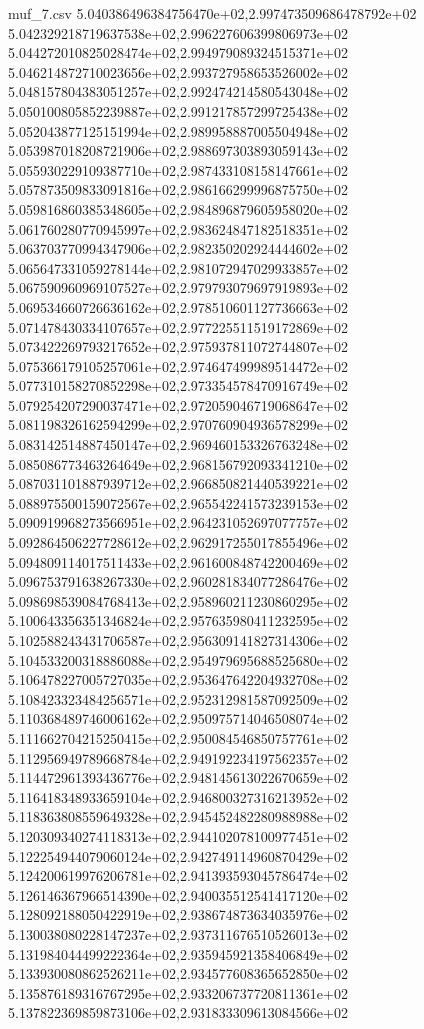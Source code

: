 \begin{filecontents*}{muf_7.csv}
5.040386496384756470e+02,2.997473509686478792e+02
5.042329218719637538e+02,2.996227606399806973e+02
5.044272010825028474e+02,2.994979089324515371e+02
5.046214872710023656e+02,2.993727958653526002e+02
5.048157804383051257e+02,2.992474214580543048e+02
5.050100805852239887e+02,2.991217857299725438e+02
5.052043877125151994e+02,2.989958887005504948e+02
5.053987018208721906e+02,2.988697303893059143e+02
5.055930229109387710e+02,2.987433108158147661e+02
5.057873509833091816e+02,2.986166299996875750e+02
5.059816860385348605e+02,2.984896879605958020e+02
5.061760280770945997e+02,2.983624847182518351e+02
5.063703770994347906e+02,2.982350202924444602e+02
5.065647331059278144e+02,2.981072947029933857e+02
5.067590960969107527e+02,2.979793079697919893e+02
5.069534660726636162e+02,2.978510601127736663e+02
5.071478430334107657e+02,2.977225511519172869e+02
5.073422269793217652e+02,2.975937811072744807e+02
5.075366179105257061e+02,2.974647499989514472e+02
5.077310158270852298e+02,2.973354578470916749e+02
5.079254207290037471e+02,2.972059046719068647e+02
5.081198326162594299e+02,2.970760904936578299e+02
5.083142514887450147e+02,2.969460153326763248e+02
5.085086773463264649e+02,2.968156792093341210e+02
5.087031101887939712e+02,2.966850821440539221e+02
5.088975500159072567e+02,2.965542241573239153e+02
5.090919968273566951e+02,2.964231052697077757e+02
5.092864506227728612e+02,2.962917255017855496e+02
5.094809114017511433e+02,2.961600848742200469e+02
5.096753791638267330e+02,2.960281834077286476e+02
5.098698539084768413e+02,2.958960211230860295e+02
5.100643356351346824e+02,2.957635980411232595e+02
5.102588243431706587e+02,2.956309141827314306e+02
5.104533200318886088e+02,2.954979695688525680e+02
5.106478227005727035e+02,2.953647642204932708e+02
5.108423323484256571e+02,2.952312981587092509e+02
5.110368489746006162e+02,2.950975714046508074e+02
5.111662704215250415e+02,2.950084546850757761e+02
5.112956949789668784e+02,2.949192234197562357e+02
5.114472961393436776e+02,2.948145613022670659e+02
5.116418348933659104e+02,2.946800327316213952e+02
5.118363808559649328e+02,2.945452482280988988e+02
5.120309340274118313e+02,2.944102078100977451e+02
5.122254944079060124e+02,2.942749114960870429e+02
5.124200619976206781e+02,2.941393593045786474e+02
5.126146367966514390e+02,2.940035512541417120e+02
5.128092188050422919e+02,2.938674873634035976e+02
5.130038080228147237e+02,2.937311676510526013e+02
5.131984044499222364e+02,2.935945921358406849e+02
5.133930080862526211e+02,2.934577608365652850e+02
5.135876189316767295e+02,2.933206737720811361e+02
5.137822369859873106e+02,2.931833309613084566e+02

\end{filecontents*}
